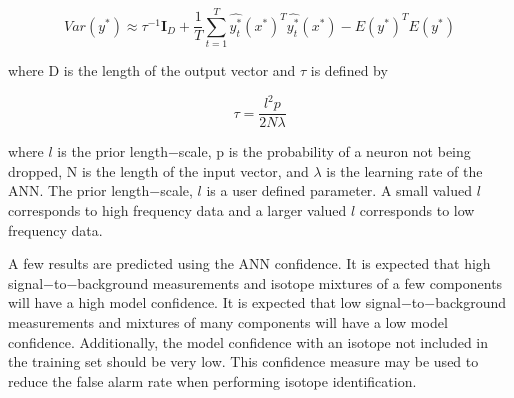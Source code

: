 \documentclass[tocnosub,noragright,centerchapter,12pt,fullpage]{uiucecethesis09}
\begin{document}
\begin{equation} \label{eq:update1}
Var (y^{*}) \approx \tau^{-1} \boldsymbol{I}_D + \frac{1}{T} \sum^{T}_{t=1} \hat{y^{*}_t} (x^{*})^{T} \hat{y^{*}_t}(x^{*}) - E(y^{*})^{T}E(y^{*})
\end{equation}

where D is the length of the output vector and $\tau$ is defined by 

\begin{equation} \label{eq:update1}
\tau = \frac{l^2 p }{2 N \lambda}
\end{equation}

where $l$ is the prior length$-$scale, p is the probability of a neuron not being dropped, N is the length of the input vector, and $\lambda$ is the learning rate of the ANN. The prior length$-$scale, $l$ is a user defined parameter. A small valued $l$ corresponds to high frequency data and a larger valued $l$ corresponds to low frequency data. 


A few results are predicted using the ANN confidence. It is expected that high signal$-$to$-$background measurements and isotope mixtures of a few components will have a high model confidence. It is expected that low signal$-$to$-$background measurements and mixtures of many components will have a low model confidence. Additionally, the model confidence with an isotope not included in the training set should be very low. This confidence measure may be used to reduce the false alarm rate when performing isotope identification. 



\end{document}
